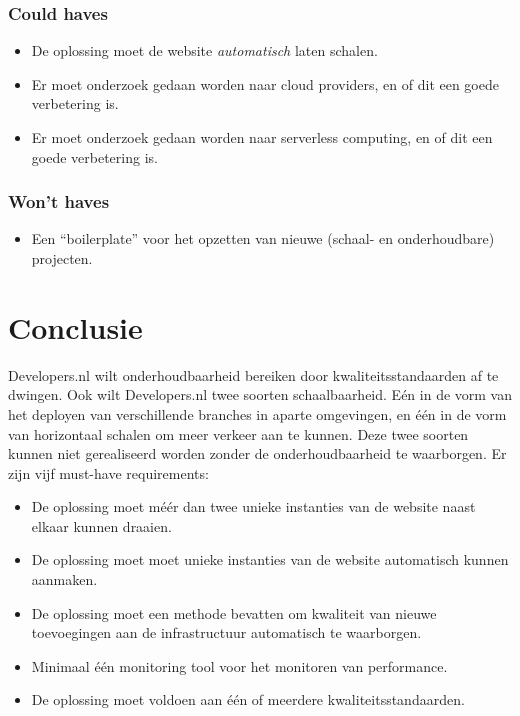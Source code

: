 \subsubsection{Could haves}
\begin{itemize}
	\item De oplossing moet de website \textit{automatisch} laten schalen.
	\item Er moet onderzoek gedaan worden naar cloud providers, en of dit een goede verbetering is.
	\item Er moet onderzoek gedaan worden naar serverless computing, en of dit een goede verbetering is.
\end{itemize}

\subsubsection{Won't haves}
\begin{itemize}
	\item Een \enquote{boilerplate} voor het opzetten van nieuwe (schaal- en onderhoudbare) projecten.
\end{itemize}

\section{Conclusie}
Developers.nl wilt onderhoudbaarheid bereiken door kwaliteitsstandaarden af te dwingen. Ook wilt Developers.nl twee soorten schaalbaarheid. Eén in de vorm van het deployen van verschillende branches in aparte omgevingen, en één in de vorm van horizontaal schalen om meer verkeer aan te kunnen. Deze twee soorten kunnen niet gerealiseerd worden zonder de onderhoudbaarheid te waarborgen. Er zijn vijf must-have requirements:

\begin{itemize}
	\item De oplossing moet méér dan twee unieke instanties van de website naast elkaar kunnen draaien.
	\item De oplossing moet moet unieke instanties van de website automatisch kunnen aanmaken.
	\item De oplossing moet een methode bevatten om kwaliteit van nieuwe toevoegingen aan de infrastructuur automatisch te waarborgen.
	\item Minimaal één monitoring tool voor het monitoren van performance.
	\item De oplossing moet voldoen aan één of meerdere kwaliteitsstandaarden.
\end{itemize}